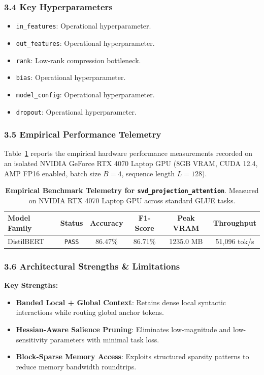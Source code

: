 \subsubsection*{3.4 Key Hyperparameters}
\begin{itemize}
    \item \texttt{in\_features}: Operational hyperparameter.
    \item \texttt{out\_features}: Operational hyperparameter.
    \item \texttt{rank}: Low-rank compression bottleneck.
    \item \texttt{bias}: Operational hyperparameter.
    \item \texttt{model\_config}: Operational hyperparameter.
    \item \texttt{dropout}: Operational hyperparameter.
\end{itemize}

\subsubsection*{3.5 Empirical Performance Telemetry}
Table~\ref{tab:telemetry_svd_projection_attention} reports the empirical hardware performance measurements recorded on an isolated NVIDIA GeForce RTX 4070 Laptop GPU (8GB VRAM, CUDA 12.4, AMP FP16 enabled, batch size $B=4$, sequence length $L=128$).

\begin{table}[h]
\centering
\small
\caption{\textbf{Empirical Benchmark Telemetry for \texttt{svd\_projection\_attention}}. Measured on NVIDIA RTX 4070 Laptop GPU across standard GLUE tasks.}
\label{tab:telemetry_svd_projection_attention}
\begin{tabular*}{\columnwidth}{@{\extracolsep{\fill}}lccccc}
\toprule
\textbf{Model Family} & \textbf{Status} & \textbf{Accuracy} & \textbf{F1-Score} & \textbf{Peak VRAM} & \textbf{Throughput} \\
\midrule
DistilBERT & \texttt{PASS} & 86.47\% & 86.71\% & 1235.0 MB & 51,096 tok/s \\
\bottomrule
\end{tabular*}
\end{table}

\subsubsection*{3.6 Architectural Strengths \& Limitations}
\textbf{Key Strengths:}
\begin{itemize}
    \item \textbf{Banded Local + Global Context}: Retains dense local syntactic interactions while routing global anchor tokens.
    \item \textbf{Hessian-Aware Salience Pruning}: Eliminates low-magnitude and low-sensitivity parameters with minimal task loss.
    \item \textbf{Block-Sparse Memory Access}: Exploits structured sparsity patterns to reduce memory bandwidth roundtrips.
\end{itemize}

